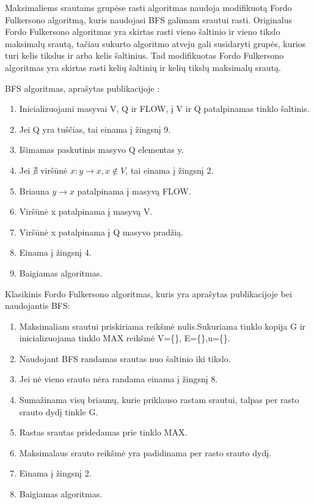 Maksimaliems srautams grupėse rasti algoritmas naudoja modifikuotą Fordo Fulkersono algoritmą, kuris naudojasi BFS \cite{BFS} galimam srautui rasti. Originalus Fordo Fulkersono algoritmas \cite{FiN} yra skirtas rasti vieno šaltinio ir vieno tikslo maksimalų srautą, tačiau sukurto algoritmo atveju gali susidaryti grupės, kurios turi kelis tikslus ir arba kelis šaltinius. Tad modifikuotas Fordo Fulkersono algoritmas yra skirtas rasti kelių šaltinių ir kelių tikslų maksimalų srautą.

BFS algoritmas, aprašytas publikacijoje :
\begin{enumerate}
	\item Inicializuojami masyvai V, Q ir FLOW, į V ir Q patalpinamas tinklo šaltinis.
	\item Jei Q yra tuščias, tai einama į žingsnį 9.
	\item Išimamas paskutinis masyvo Q elementas y.
	\item Jei $\nexists$ viršūnė $x : y \rightarrow x, x \notin V$, tai einama į žingsnį 2. 
	\item Briauna $y  \rightarrow x$ patalpinama į masyvą FLOW. 
	\item Viršūnė x patalpinama į masyvą V.
	\item Viršūnė x patalpinama į Q masyvo pradžią. 
	\item Einama į žingsnį 4. 
	\item Baigiamas algoritmas.
\end{enumerate}

Klasikinis Fordo Fulkersono algoritmas, kuris yra aprašytas publikacijoje bei naudojantis BFS:
\begin{enumerate}
	\item Maksimaliam srautui priskiriama reikšmė nulis.Sukuriama tinklo kopija G ir inicializuojama tinklo MAX reikšmė {V=\{\}, E=\{\},u=\{\}}.
	\item Naudojant BFS randamas srautas nuo šaltinio iki tikslo.
	\item Jei nė vieno srauto nėra randama einama į žingsnį 8.
	\item Sumažinama visų briaunų, kurie priklauso rastam srautui, talpas per rasto srauto dydį tinkle G.
	\item Rastas srautas pridedamas prie tinklo MAX.
	\item Maksimalaus srauto reikšmė yra padidinama per rasto srauto dydį.
	\item Einama į žingsnį 2.
	\item Baigiamas algoritmas.
\end{enumerate}


